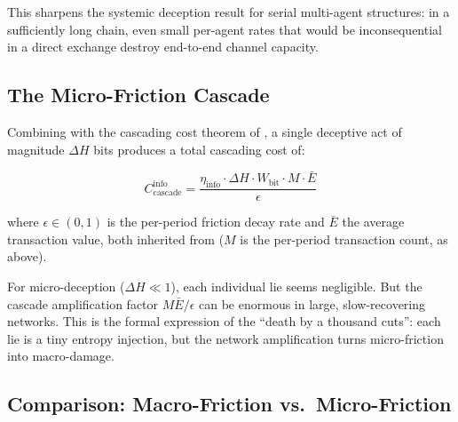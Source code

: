 \documentclass[11pt]{article}
\theoremstyle{plain}
\theoremstyle{definition}
\theoremstyle{remark}
\let\origsubsection\subsection
\renewcommand{\subsection}{\needspace{7\baselineskip}\origsubsection}
\begin{document}
This sharpens the systemic deception result for serial multi-agent
structures: in a sufficiently long chain, even small per-agent rates
that would be inconsequential in a direct exchange destroy end-to-end
channel capacity.

\subsection{The Micro-Friction
Cascade}\label{the-micro-friction-cascade}

Combining with the cascading cost theorem of \citep{TC-IV}, a single
deceptive act of magnitude \(\Delta H\) bits produces a total cascading
cost of:

\[C_{\text{cascade}}^{\text{info}} = \frac{\eta_{\text{info}} \cdot \Delta H \cdot W_{\text{bit}} \cdot M \cdot \bar{E}}{\epsilon}\]

where \(\epsilon \in (0, 1)\) is the per-period friction decay rate and
\(\bar{E}\) the average transaction value, both inherited from
\citep{TC-IV} (\(M\) is the per-period transaction count, as above).

For micro-deception (\(\Delta H \ll 1\)), each individual lie seems
negligible. But the cascade amplification factor
\(M \bar{E} / \epsilon\) can be enormous in large, slow-recovering
networks. This is the formal expression of the ``death by a thousand
cuts'': each lie is a tiny entropy injection, but the network
amplification turns micro-friction into macro-damage.

\subsection{Comparison: Macro-Friction
vs.~Micro-Friction}\label{comparison-macro-friction-vs.-micro-friction}
\end{document}
